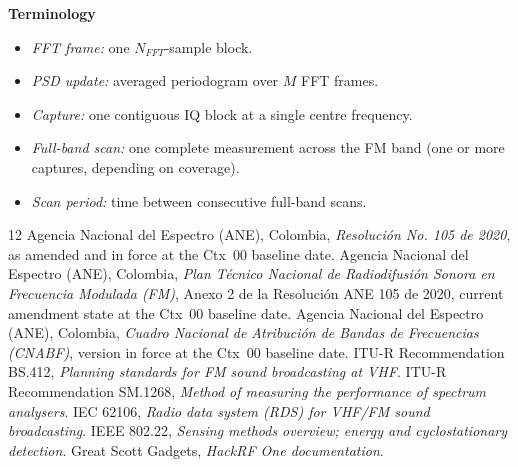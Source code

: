 \documentclass[12pt,a4paper]{report}
\begin{document}
 {\small
 \textbf{Terminology}
 \begin{itemize}
 	\item \textit{FFT frame:} one $N_{FFT}$-sample block.
 	\item \textit{PSD update:} averaged periodogram over $M$ FFT frames.
 	\item \textit{Capture:} one contiguous IQ block at a single centre frequency.
 	\item \textit{Full-band scan:} one complete measurement across the FM band
 	(one or more captures, depending on coverage).
 	\item \textit{Scan period:} time between consecutive full-band scans.
 \end{itemize}
 \begin{thebibliography}{12}
 	 Agencia Nacional del Espectro (ANE), Colombia, \emph{Resoluci\'{o}n No. 105 de 2020}, as amended and in force at the Ctx~00 baseline date.
 	 Agencia Nacional del Espectro (ANE), Colombia, \emph{Plan T\'{e}cnico Nacional de Radiodifusi\'{o}n Sonora en Frecuencia Modulada (FM)}, Anexo 2 de la Resoluci\'{o}n ANE 105 de 2020, current amendment state at the Ctx~00 baseline date.
 	 Agencia Nacional del Espectro (ANE), Colombia, \emph{Cuadro Nacional de Atribuci\'{o}n de Bandas de Frecuencias (CNABF)}, version in force at the Ctx~00 baseline date.
 	 ITU-R Recommendation BS.412, \emph{Planning standards for FM sound broadcasting at VHF}.
 	 ITU-R Recommendation SM.1268, \emph{Method of measuring the performance of spectrum analysers}.
 	 IEC 62106, \emph{Radio data system (RDS) for VHF/FM sound broadcasting}.
 	 IEEE 802.22, \emph{Sensing methods overview; energy and cyclostationary detection}.
 	 Great Scott Gadgets, \emph{HackRF One documentation}.
 \end{thebibliography}}
\end{document}
